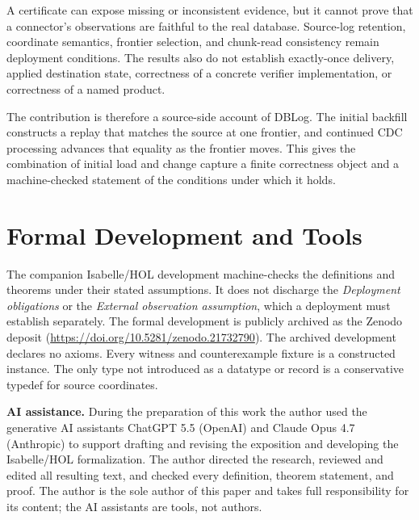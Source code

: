 \documentclass[letterpaper,10pt,twocolumn]{article}
\begin{document}
A certificate can expose missing or inconsistent evidence, but it
cannot prove that a connector's observations are faithful to the real
database. Source-log retention, coordinate semantics, frontier
selection, and chunk-read consistency remain deployment conditions. The
results also do not establish exactly-once delivery, applied destination
state, correctness of a concrete verifier implementation, or
correctness of a named product.

The contribution is therefore a source-side account of DBLog. The
initial backfill constructs a replay that matches the source at one
frontier, and continued CDC processing advances that equality as the
frontier moves. This gives the combination of initial load and change
capture a finite correctness object and a machine-checked statement of
the conditions under which it holds.

\section*{Formal Development and Tools}\label{formal-development-and-tools}

The companion Isabelle/HOL development machine-checks the definitions
and theorems under their stated assumptions. It does not discharge the
\emph{Deployment obligations} or the \emph{External observation
assumption}, which a deployment must establish separately. The formal
development is publicly archived as
the Zenodo deposit \cite{andreakis2026dblog_virtual_cuts}
(\url{https://doi.org/10.5281/zenodo.21732790}). The archived
development declares no axioms. Every witness and counterexample
fixture is a constructed instance. The only type not introduced as a
datatype or record is a conservative typedef for source coordinates.

\smallskip
\noindent\textbf{AI assistance.} During the preparation of this work the author
used the generative AI assistants ChatGPT 5.5 (OpenAI)
and Claude Opus 4.7 (Anthropic) to support drafting and
revising the exposition and developing the Isabelle/HOL
formalization. The author directed the research, reviewed
and edited all resulting text, and checked every definition,
theorem statement, and proof. The author is the sole author
of this paper and takes full responsibility for its content; the
AI assistants are tools, not authors.

\clearpage

\end{document}
